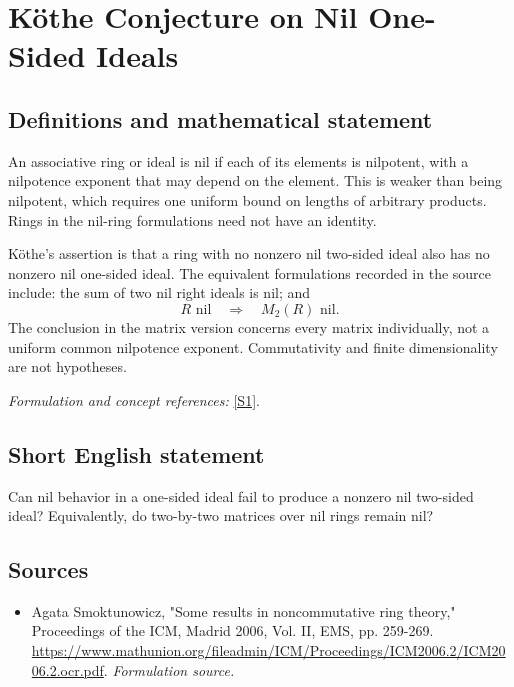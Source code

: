 \documentclass[11pt]{article}
\begin{document}
\section*{\texorpdfstring{Köthe Conjecture on Nil One-Sided Ideals}{Köthe Conjecture on Nil One-Sided Ideals}}\label{467}
\subsection{Definitions and mathematical statement}
An associative ring or ideal is nil if each of its elements is nilpotent, with a nilpotence exponent that may depend on the element. This is weaker than being nilpotent, which requires one uniform bound on lengths of arbitrary products. Rings in the nil-ring formulations need not have an identity.

K\"othe's assertion is that a ring with no nonzero nil two-sided ideal also has no nonzero nil one-sided ideal. The equivalent formulations recorded in the source include: the sum of two nil right ideals is nil; and
\[
 R\text{ nil}\quad\Longrightarrow\quad M_2(R)\text{ nil}.
\]
The conclusion in the matrix version concerns every matrix individually, not a uniform common nilpotence exponent. Commutativity and finite dimensionality are not hypotheses.
\par\smallskip\textit{Formulation and concept references:} \href{https://www.mathunion.org/fileadmin/ICM/Proceedings/ICM2006.2/ICM2006.2.ocr.pdf}{[S1]}.

\subsection{Short English statement}
Can nil behavior in a one-sided ideal fail to produce a nonzero nil two-sided ideal? Equivalently, do two-by-two matrices over nil rings remain nil?
\subsection{Sources}
\begin{itemize}
\item[S1]Agata Smoktunowicz, "Some results in noncommutative ring theory," Proceedings of the ICM, Madrid 2006, Vol. II, EMS, pp. 259-269.
\url{https://www.mathunion.org/fileadmin/ICM/Proceedings/ICM2006.2/ICM2006.2.ocr.pdf}.
\textit{Formulation source.}
\end{itemize}
\end{document}
